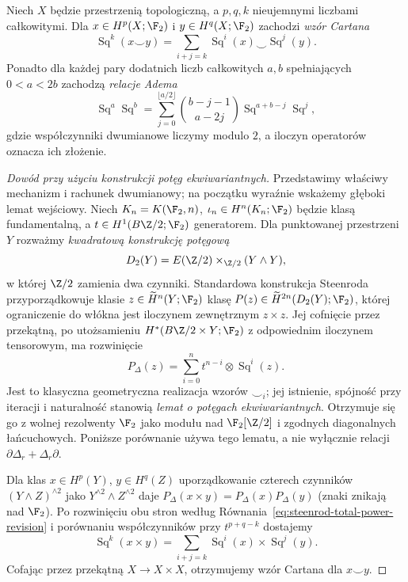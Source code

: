 \begin{twierdzenie}
\label{thm:steenrod-cartan-v7}
Niech $X$ będzie przestrzenią topologiczną, a
$p,q,k$ nieujemnymi liczbami całkowitymi.
Dla $x\in H^p(X;\F_2)$ i
$y\in H^q(X;\F_2)$ zachodzi \emph{wzór Cartana}
\[
\operatorname{Sq}^k(x\smile y)=
\sum_{i+j=k}\operatorname{Sq}^i(x)\smile\operatorname{Sq}^j(y).
\]
Ponadto dla każdej pary dodatnich liczb całkowitych
$a,b$ spełniających $0<a<2b$ zachodzą
\emph{relacje Adema}
\[
\operatorname{Sq}^a\operatorname{Sq}^b
=\sum_{j=0}^{\lfloor a/2\rfloor}
\binom{b-j-1}{a-2j}\operatorname{Sq}^{a+b-j}\operatorname{Sq}^j,
\]
gdzie współczynniki dwumianowe liczymy modulo $2$,
a iloczyn operatorów oznacza ich złożenie.
\end{twierdzenie}
\begin{proof}[Dowód przy użyciu konstrukcji potęg ekwiwariantnych]
Przedstawimy właściwy mechanizm i rachunek dwumianowy;
na początku wyraźnie wskażemy głęboki lemat wejściowy.
Niech $K_n=K(\F_2,n)$, $\iota_n\in H^n(K_n;\F_2)$
będzie klasą fundamentalną, a
$t\in H^1(B\Z/2;\F_2)$ generatorem.
Dla punktowanej przestrzeni $Y$ rozważmy
\emph{kwadratową konstrukcję potęgową}
\[
 D_2(Y)=E(\Z/2)\times_{\Z/2}(Y\wedge Y),
\]
w której $\Z/2$ zamienia dwa czynniki.
Standardowa konstrukcja Steenroda przyporządkowuje
klasie $z\in\widetilde H^n(Y;\F_2)$ klasę
$P(z)\in\widetilde H^{2n}(D_2(Y);\F_2)$,
której ograniczenie do włókna jest iloczynem
zewnętrznym $z\times z$. Jej cofnięcie przez
przekątną, po utożsamieniu
$H^*(B\Z/2\times Y;\F_2)$ z odpowiednim
iloczynem tensorowym, ma rozwinięcie
\begin{equation}\label{eq:steenrod-total-power-revision}
 P_{\Delta}(z)=\sum_{i=0}^n t^{n-i}\otimes
 \operatorname{Sq}^i(z).
\end{equation}
Jest to klasyczna geometryczna realizacja wzorów
$\smile_i$; jej istnienie, spójność przy iteracji
i naturalność stanowią \emph{lemat o potęgach
ekwiwariantnych}. Otrzymuje się go z wolnej
rezolwenty $\F_2$ jako modułu nad $\F_2[\Z/2]$
i zgodnych diagonalnych łańcuchowych. Poniższe
porównanie używa tego lematu, a nie wyłącznie
relacji $\partial\Delta_r+\Delta_r\partial$.

Dla klas $x\in H^p(Y)$, $y\in H^q(Z)$
uporządkowanie czterech czynników
$(Y\wedge Z)^{\wedge2}$ jako
$Y^{\wedge2}\wedge Z^{\wedge2}$ daje
$P_{\Delta}(x\times y)=P_{\Delta}(x)
P_{\Delta}(y)$ (znaki znikają nad $\F_2$).
Po rozwinięciu obu stron według
Równania~\ref{eq:steenrod-total-power-revision}
i porównaniu współczynników przy
$t^{p+q-k}$ dostajemy
\[
 \operatorname{Sq}^k(x\times y)
 =\sum_{i+j=k}\operatorname{Sq}^i(x)\times
  \operatorname{Sq}^j(y).
\]
Cofając przez przekątną $X\to X\times X$,
otrzymujemy wzór Cartana dla $x\smile y$.


\end{proof}
